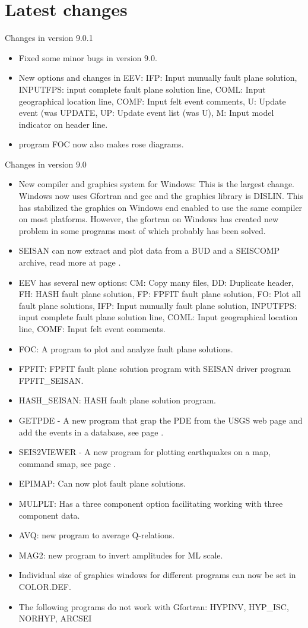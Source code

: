 \section{Latest changes}
Changes in version 9.0.1
\begin{itemize}
\item Fixed some minor bugs in version 9.0.
\item New options and changes in EEV: IFP: Input munually fault plane solution, INPUTFPS: input complete fault plane solution line, COML: Input geographical location line, COMF: Input felt event comments, U: Update event (was UPDATE, UP: Update event list (was U), M: Input model indicator on header line.
\item program FOC now also makes rose diagrams.

\end{itemize}

Changes in version 9.0 
\begin{itemize}
\item New compiler and graphics system for Windows: This is the largest change. Windows now uses Gfortran and gcc and the graphics library is DISLIN. This has stabilized the graphics on Windows end enabled to use the same compiler on most platforms. However, the gfortran on Windows has created new problem in some programs most of which probably has been solved.
\item SEISAN can now extract and plot data from a BUD and a SEISCOMP archive, read more at page \pageref{page:bud-archive}.
\item EEV has several new options: CM: Copy many files, DD: Duplicate header, FH: HASH fault plane solution, FP: FPFIT fault plane solution, FO: Plot all fault plane solutions, IFP: Input munually fault plane solution, INPUTFPS: input complete fault plane solution line, COML: Input geographical location line, COMF: Input felt event comments.
\item FOC: A program to plot and analyze fault plane solutions.
\item FPFIT: FPFIT fault plane solution program with SEISAN driver program FPFIT\_SEISAN.
\item HASH\_SEISAN: HASH fault plane solution program.
\item GETPDE - A new program that grap the PDE from the USGS web page and add the events in a database, see page \pageref{page:getpde}.
\item SEIS2VIEWER - A new program for plotting earthquakes on a map, command smap, see page \pageref{page:seis2viewer}.
\item EPIMAP: Can now plot fault plane solutions.
\item MULPLT: Has a three component option facilitating working with three component data.
\item AVQ: new program to average Q-relations.
\item MAG2: new program to invert amplitudes for ML scale.
\item Individual size of graphics windows for different programs can now be set in COLOR.DEF.
\item The following programs do not work with Gfortran: HYPINV, HYP\_ISC, NORHYP, ARCSEI
\end{itemize}


